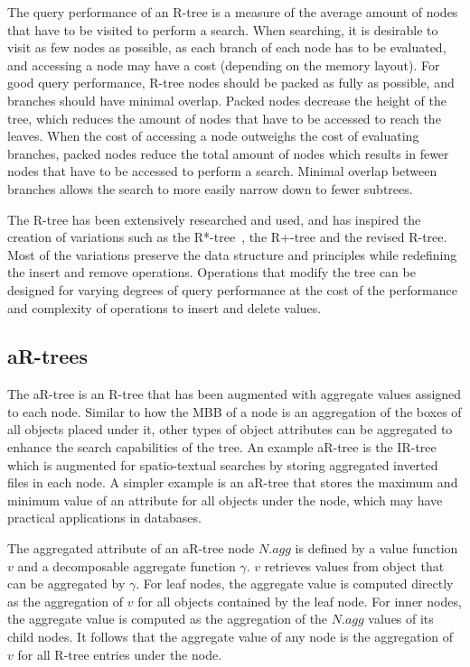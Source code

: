 The query performance of an R-tree is a measure of the average amount of nodes that have to be visited to perform a search. When searching, it is desirable to visit as few nodes as possible, as each branch of each node has to be evaluated, and accessing a node may have a cost (depending on the memory layout). For good query performance, R-tree nodes should be packed as fully as possible, and branches should have minimal overlap. Packed nodes decrease the height of the tree, which reduces the amount of nodes that have to be accessed to reach the leaves. When the cost of accessing a node outweighs the cost of evaluating branches, packed nodes reduce the total amount of nodes which results in fewer nodes that have to be accessed to perform a search. Minimal overlap between branches allows the search to more easily narrow down to fewer subtrees.

The R-tree has been extensively researched and used, and has inspired the creation of variations such as the R*-tree~\cite{beckmann1990r}, the R+-tree and the revised R-tree. Most of the variations preserve the data structure and principles while redefining the insert and remove operations. Operations that modify the tree can be designed for varying degrees of query performance at the cost of the performance and complexity of operations to insert and delete values.

\subsection{aR-trees}

The aR-tree is an R-tree that has been augmented with aggregate values assigned to each node. Similar to how the MBB of a node is an aggregation of the boxes of all objects placed under it, other types of object attributes can be aggregated to enhance the search capabilities of the tree. An example aR-tree is the IR-tree~\cite{li2010ir} which is augmented for spatio-textual searches by storing aggregated inverted files in each node. A simpler example is an aR-tree that stores the maximum and minimum value of an attribute for all objects under the node, which may have practical applications in databases.

The aggregated attribute of an aR-tree node \(N.agg\) is defined by a value function \(v\) and a decomposable aggregate function \(\gamma\). \(v\) retrieves values from object that can be aggregated by \(\gamma\). For leaf nodes, the aggregate value is computed directly as the aggregation of \(v\) for all objects contained by the leaf node. For inner nodes, the aggregate value is computed as the aggregation of the \(N.agg\) values of its child nodes. It follows that the aggregate value of any node is the aggregation of \(v\) for all R-tree entries under the node.


